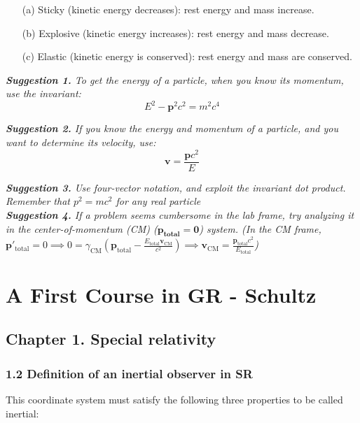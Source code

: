 \documentclass[12pt]{book}
\begin{document}
            \begin{enumerate}
                \item[(a)] Sticky (kinetic energy decreases): rest energy and mass increase.
                \item[(b)] Explosive (kinetic energy increases): rest energy and mass decrease.
                \item[(c)] Elastic (kinetic energy is conserved): rest energy and mass are conserved.
            \end{enumerate}
            
        
        \textit{\textbf{Suggestion 1.} To get the energy of a particle, when you know its momentum, use the invariant:}
        \[
            E^2-\bm{p}^2c^2=m^2c^4    
        \] 
        
        \textit{\textbf{Suggestion 2.} If you know the energy and momentum of a particle, and you want to determine its velocity, use:}
        \[
            \bm{v}=\frac{\bm{p}c^2}{E}
        \]
        
        \textit{\textbf{Suggestion 3.} Use four-vector notation, and exploit the invariant dot product. Remember that \(p^2=mc^2\) for any real particle}\\
        
        \textit{\textbf{Suggestion 4.} If a problem seems cumbersome in the lab frame, try analyzing it in the center-of-momentum (CM) (\(\bm{p_{total}=0}\)) system. (In the CM frame, \( \mathbf{p}'_{\text{total}} = 0 \implies 0 = \gamma_{\text{CM}} \left( \mathbf{p}_{\text{total}} - \frac{E_{\text{total}} \mathbf{v}_{\text{CM}}}{c^2} \right) \implies \mathbf{v}_{\text{CM}} = \frac{\mathbf{p}_{\text{total}} c^2}{E_{\text{total}}} \))}


\chapter{A First Course in GR - Schultz}

\section{Chapter 1. Special relativity}
    \subsection{1.2 Definition of an inertial observer in SR}
        This coordinate system must satisfy the following three properties to be called inertial:
\end{document}
